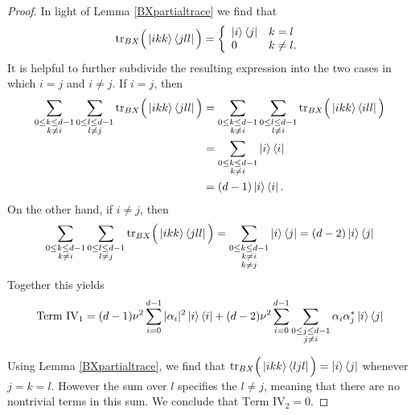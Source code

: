 \documentclass[reqno]{amsart}
\numberwithin{lemma}{section}
\numberwithin{proposition}{section}
\newcommand{\tr}{\textnormal{tr}}
\begin{document}
{\begin{proof}
 In light of Lemma \ref{BXpartialtrace} we find that
\begin{equation*}
\tr_{BX} \Big ( \ket{ikk}\bra{jll} \Big ) = \left \{ \begin{array}{ll}
\ket{i}\bra{j} & k = l\\
0 & k \neq l.
\end{array}
\right .
\end{equation*}
It is helpful to further subdivide the resulting expression into the two cases in which $i = j$ and $i \neq j$.
If $i =j$, then
\begin{align*}
\sum_{\substack{0 \leq k \leq d-1\\ k \neq i}} \sum_{\substack{0 \leq l \leq d-1\\ l \neq j}} \tr_{BX} \Big ( \ket{ikk}\bra{jll} \Big ) 
&= \sum_{\substack{0 \leq k \leq d-1\\ k \neq i}} \sum_{\substack{0 \leq l \leq d-1\\ l \neq i}} \tr_{BX} \Big ( \ket{ikk}\bra{ill} \Big )\\
&= \sum_{\substack{0 \leq k \leq d-1\\ k \neq i}} \ket{i}\bra{i}\\
&= (d-1) \ket{i}\bra{i}.
\end{align*}
On the other hand, if $i \neq j$, then
\begin{align*}
\sum_{\substack{0 \leq k \leq d-1\\ k \neq i}} \sum_{\substack{0 \leq l \leq d-1\\ l \neq j}} \tr_{BX} \Big ( \ket{ikk}\bra{jll} \Big )
= \sum_{\substack{0 \leq k \leq d-1\\ k \neq i\\
k \neq j}} \ket{i}\bra{j}
= (d-2) \ket{i}\bra{j}
\end{align*}
Together this yields
\begin{equation*}
\text{Term IV}_{1} = (d-1) \nu^{2} \sum_{i=0}^{d-1} \vert \alpha_{i} \vert^{2} \ket{i}\bra{i} + (d-2) \nu^{2} \sum_{i=0}^{d-1} \sum_{\substack{0 \leq j \leq d-1\\ j \neq i}} \alpha_{i} \alpha_{j}^{*} \ket{i}\bra{j}
\end{equation*}

\smallskip

Using Lemma \ref{BXpartialtrace}, we find that $\tr_{BX} \Big ( \ket{ikk}\bra{ljl} \Big ) = \ket{i}\bra{j}$ whenever $j = k = l$. However the sum over $l$ specifies the $l \neq j$, meaning that there are no nontrivial terms in this sum. We conclude that $\text{Term IV}_{2} = 0.$



\end{proof}}
\end{document}
